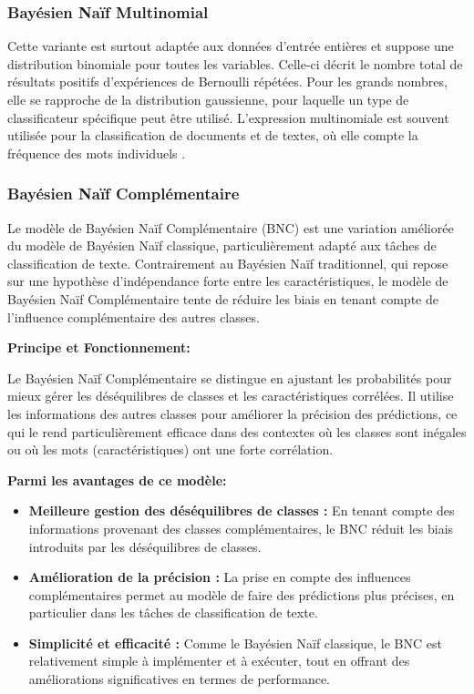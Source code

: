 \subsubsection{Bayésien Naïf Multinomial}
Cette variante est surtout adaptée aux données d'entrée entières et suppose une distribution binomiale pour toutes les variables. Celle-ci décrit le nombre total de résultats positifs d'expériences de Bernoulli répétées. Pour les grands nombres, elle se rapproche de la distribution gaussienne, pour laquelle un type de classificateur spécifique peut être utilisé. L'expression multinomiale est souvent utilisée pour la classification de documents et de textes, où elle compte la fréquence des mots individuels \cite{konfuzio}.
\subsubsection{Bayésien Naïf Complémentaire}
Le modèle de Bayésien Naïf Complémentaire (BNC) est une variation améliorée du modèle de Bayésien Naïf classique, particulièrement adapté aux tâches de classification de texte. Contrairement au Bayésien Naïf traditionnel, qui repose sur une hypothèse d'indépendance forte entre les caractéristiques, le modèle de Bayésien Naïf Complémentaire tente de réduire les biais en tenant compte de l'influence complémentaire des autres classes.

\textbf{Principe et Fonctionnement:} \par
Le Bayésien Naïf Complémentaire se distingue en ajustant les probabilités pour mieux gérer les déséquilibres de classes et les caractéristiques corrélées. Il utilise les informations des autres classes pour améliorer la précision des prédictions, ce qui le rend particulièrement efficace dans des contextes où les classes sont inégales ou où les mots (caractéristiques) ont une forte corrélation.

\textbf{Parmi les avantages de ce modèle: }

\begin{itemize}
    \item \textbf{Meilleure gestion des déséquilibres de classes :} En tenant compte des informations provenant des classes complémentaires, le BNC réduit les biais introduits par les déséquilibres de classes.
    \item \textbf{Amélioration de la précision :} La prise en compte des influences complémentaires permet au modèle de faire des prédictions plus précises, en particulier dans les tâches de classification de texte.
    \item \textbf{Simplicité et efficacité :} Comme le Bayésien Naïf classique, le BNC est relativement simple à implémenter et à exécuter, tout en offrant des améliorations significatives en termes de performance.
    
\end{itemize}


